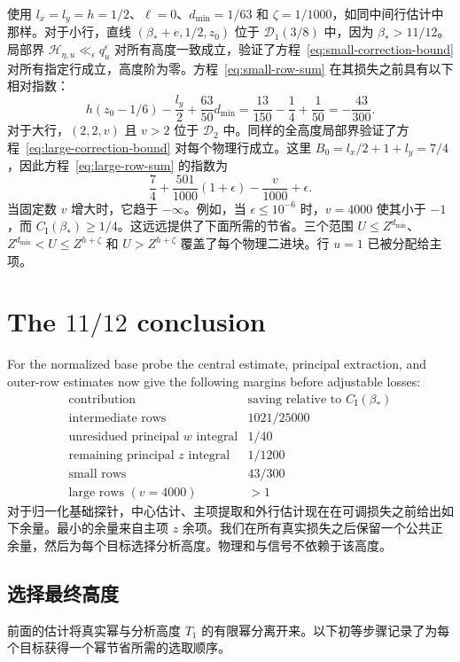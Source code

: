 \documentclass[11pt,a4paper]{article}
\numberwithin{equation}{section}
\numberwithin{figure}{section}
\theoremstyle{definition}
\theoremstyle{remark}
\begin{document}
使用 $l_x=l_y=h=1/2$、$\ell=0$、$d_{\min}=1/63$ 和 $\zeta=1/1000$，如同中间行估计中那样。对于小行，直线 $(\beta_*+e,1/2,z_0)$ 位于 $\mathcal D_1(3/8)$ 中，因为 $\beta_*>11/12$。局部界 $\mathcal H_{\eta,u}\ll_\epsilon q_u^\epsilon$ 对所有高度一致成立，验证了方程~\eqref{eq:small-correction-bound} 对所有指定行成立，高度阶为零。方程~\eqref{eq:small-row-sum} 在其损失之前具有以下相对指数：
\[
 h(z_0-1/6)-\frac{l_y}{2}+\frac{63}{50}d_{\min}
 =\frac{13}{150}-\frac14+\frac1{50}
 =-\frac{43}{300}.
\]
对于大行，$(2,2,v)$ 且 $v>2$ 位于 $\mathcal D_2$ 中。同样的全高度局部界验证了方程~\eqref{eq:large-correction-bound} 对每个物理行成立。这里 $B_0=l_x/2+1+l_y=7/4$，因此方程~\eqref{eq:large-row-sum} 的指数为
\[
 \frac74+\frac{501}{1000}(1+\epsilon)-\frac v{1000}+\epsilon.
\]
当固定数 $v$ 增大时，它趋于 $-\infty$。例如，当 $\epsilon\le10^{-6}$ 时，$v=4000$ 使其小于 $-1$，而 $C_{\mathrm I}(\beta_*)\ge1/4$。这远远提供了下面所需的节省。三个范围 $U\le Z^{d_{\min}}$、$Z^{d_{\min}}<U\le Z^{h+\zeta}$ 和 $U>Z^{h+\zeta}$ 覆盖了每个物理二进块。行 $u=1$ 已被分配给主项。

\section{The \texorpdfstring{$11/12$}{11/12} conclusion}
\label{sec:eleven-twelfths-conclusion}For the normalized base probe the central estimate, principal extraction,
and outer-row estimates now give the following margins before adjustable
losses:
\[
\begin{array}{c|c}
 \text{contribution}&\text{saving relative to }C_{\mathrm I}(\beta_*)\\\hline
 \text{intermediate rows}&1021/25000\\
 \text{unresidued principal }w\text{ integral}&1/40\\
 \text{remaining principal }z\text{ integral}&1/1200\\
 \text{small rows}&43/300\\
 \text{large rows }(v=4000)&>1
\end{array}
\]
对于归一化基础探针，中心估计、主项提取和外行估计现在在可调损失之前给出如下余量。最小的余量来自主项 $z$ 余项。我们在所有真实损失之后保留一个公共正余量，然后为每个目标选择分析高度。物理和与信号不依赖于该高度。

\subsection{选择最终高度}

前面的估计将真实幂与分析高度 $T_1$ 的有限幂分离开来。以下初等步骤记录了为每个目标获得一个幂节省所需的选取顺序。
\end{document}
